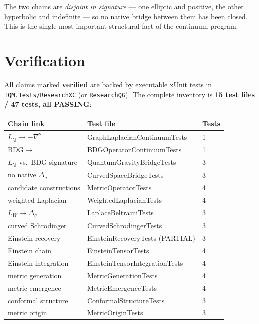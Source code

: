 \documentclass[10pt,a4paper]{article}
\begin{document}
The two chains are \emph{disjoint in signature} --- one elliptic and positive, the other
hyperbolic and indefinite --- so no native bridge between them has been closed. This is the
single most important structural fact of the continuum program.

\section{Verification}

All claims marked \textbf{verified} are backed by executable xUnit tests in
\texttt{TQM.Tests/ResearchXC} (or \texttt{ResearchQG}). The complete inventory is
\textbf{15 test files / 47 tests, all PASSING}:

\begin{center}
\begin{tabular}{lll}
\toprule
Chain link & Test file & Tests \\
\midrule
$L_Q\to-\nabla^2$ & GraphLaplacianContinuumTests & 1 \\
BDG$\to\square$ & BDGOperatorContinuumTests & 1 \\
$L_Q$ vs.\ BDG signature & QuantumGravityBridgeTests & 3 \\
no native $\Delta_g$ & CurvedSpaceBridgeTests & 3 \\
candidate constructions & MetricOperatorTests & 4 \\
weighted Laplacian & WeightedLaplacianTests & 4 \\
$L_W\to\Delta_g$ & LaplaceBeltramiTests & 3 \\
curved Schr\"odinger & CurvedSchrodingerTests & 3 \\
Einstein recovery & EinsteinRecoveryTests (PARTIAL) & 3 \\
Einstein chain & EinsteinTensorTests & 4 \\
Einstein integration & EinsteinTensorIntegrationTests & 4 \\
metric generation & MetricGenerationTests & 4 \\
metric emergence & MetricEmergenceTests & 4 \\
conformal structure & ConformalStructureTests & 3 \\
metric origin & MetricOriginTests & 3 \\
\bottomrule
\end{tabular}
\end{center}
\end{document}
